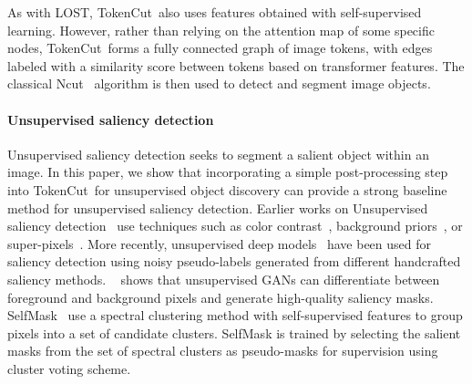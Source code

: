 \documentclass[twocolumn]{article}
\newcommand{\name} {TokenCut}
\begin{document}
As with LOST, \name~also uses  features obtained with self-supervised learning. However, rather than  relying on the attention map of some specific nodes, \name~forms a fully connected graph of image tokens, with edges labeled with a similarity score between tokens based on transformer features. The classical  Ncut~\cite{shi2000normalized} algorithm is then used to detect and segment image objects.



\paragraph*{Unsupervised saliency detection}
Unsupervised saliency detection seeks to segment a salient object within an image. 
In this paper, we show that incorporating a simple post-processing step into \name~for unsupervised object discovery can provide a strong baseline method for unsupervised saliency detection. Earlier works on Unsupervised saliency detection~\cite{yan2013hierarchical, zhu2014saliency, jiang2013salient, li2015weighted} use techniques such as color contrast~\cite{cheng2014global}, background priors~\cite{wei2012geodesic}, or super-pixels~\cite{li2015weighted, yang2013saliency}. More recently, unsupervised deep models~\cite{ zhang2018deep, nguyen2019deepusps}  have been used for saliency detection using noisy pseudo-labels generated from different handcrafted saliency methods. ~\cite{voynov2021object} shows that unsupervised GANs can differentiate between foreground and background pixels and generate high-quality saliency masks. SelfMask~\cite{shin2022selfmask} use a spectral clustering method with self-supervised features to group pixels into a set of candidate clusters. SelfMask is trained by selecting the salient masks from the set of spectral clusters as pseudo-masks for supervision using cluster voting scheme.
\end{document}

